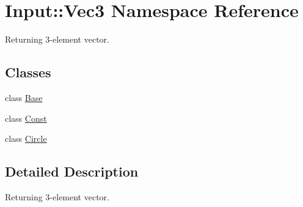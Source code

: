 \hypertarget{namespaceInput_1_1Vec3}{
\section{Input::Vec3 Namespace Reference}
\label{namespaceInput_1_1Vec3}
}


Returning 3-\/element vector.  
\subsection*{Classes}
\begin{DoxyCompactItemize}
\item 
class \hyperlink{classInput_1_1Vec3_1_1Base}{Base}
\item 
class \hyperlink{classInput_1_1Vec3_1_1Const}{Const}
\item 
class \hyperlink{classInput_1_1Vec3_1_1Circle}{Circle}
\end{DoxyCompactItemize}


\subsection{Detailed Description}
Returning 3-\/element vector. 
